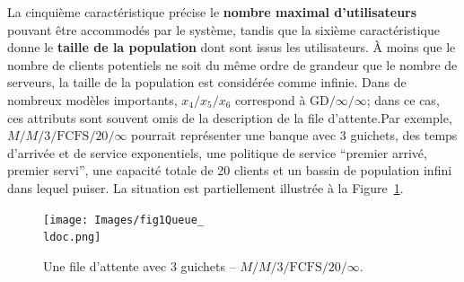 \newl
La cinquième caractéristique précise le \textbf{nombre maximal d’utilisateurs} pouvant être accommodés par le système, tandis que la sixième caractéristique  donne le \textbf{taille de la population} dont sont issus les utilisateurs. À moins que le nombre de clients potentiels ne soit du même ordre de grandeur que le nombre de serveurs, la taille de la population est considérée comme infinie. \newl Dans de nombreux modèles importants, $x_4/x_5/x_6$ correspond à $\textrm{GD}/\infty/\infty$; dans ce cas, ces attributs sont souvent omis de la description de la file d'attente.\newl  Par exemple, $M/M/3/\textrm{FCFS}/20/\infty$ pourrait représenter une banque avec 3 guichets, des temps d'arrivée et de service exponentiels, une politique de service ``premier arrivé, premier servi'', une capacité totale de 20 clients et un bassin de population infini dans lequel puiser. La situation est partiellement illustrée à la Figure~\ref{fig:1}.
\begin{figure}[t]
	\centering
		\texttt{[image: Images/fig1Queue\_\\ldoc.png]}
	\caption{\small Une file d'attente avec $3$ guichets  -- $M/M/3/\textrm{FCFS}/20/\infty$.}
	\label{fig:1}
\end{figure}
